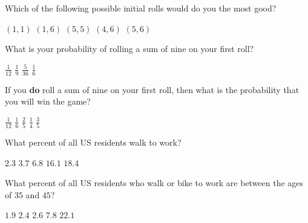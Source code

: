 \documentclass[answers,12pt]{exam}
\begin{document}
\begin{questions}
\question\label{FirstCraps}
Which of the following possible initial rolls
would do you the most good?\\
\begin{oneparchoices}
\choice $\left(1,1\right)$ %
\correctchoice $\left(1,6\right)$
\choice $\left(5,5\right)$ %
\choice $\left(4,6\right)$
\choice $\left(5,6\right)$ %
\end{oneparchoices}

\question\label{FirstCraps}
What is your probability of rolling a sum
of nine on your first roll?\\
\begin{oneparchoices}
\choice $\frac{1}{12}$ %
\correctchoice $\frac{1}{9}$
\choice $\frac{5}{36}$
\choice $\frac{1}{6}$ %
\end{oneparchoices}

\question\label{LastCraps}
If you {\bf do} roll a sum of nine on your first roll,
then what is the probability that you will win the game?\\
\begin{oneparchoices}
\choice $\frac{1}{12}$ %
\choice $\frac{1}{6}$  %
\correctchoice $\frac{2}{5}$  %
\choice $\frac{1}{4}$  %
\choice $\frac{3}{5}$  %
\end{oneparchoices}


\question\label{FirstWalk}
What percent of all US residents walk to work?\\
\begin{oneparchoices}
\choice $2.3$ %
\choice $3.7$ %
\choice $6.8$ %
\choice $16.1$ %
\correctchoice $18.4$
\end{oneparchoices}

\question
What percent of all US residents who walk or bike to work
are between the ages of $35$ and $45$?\\
\begin{oneparchoices}
\choice $1.9$ %
\correctchoice $2.4$
\choice $2.6$ %
\choice $7.8$ %
\choice $22.1$ %
\end{oneparchoices}


\end{questions}
\end{document}
